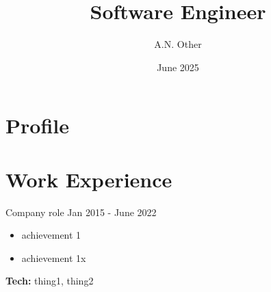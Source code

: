 \documentclass[9pt]{smart-cv}
\author{A.N. Other}
\title{Software Engineer}
\date{June 2025}
\begin{document}
  \begin{two-col}
    {
      \section*{Profile}

      \lipsum[1]
    }

    \section{Work Experience}

    \begin{job}
      {Company}
      {role}
      {Jan 2015 - June 2022}
      \begin{itemize}
        \item achievement 1
        \item achievement 1x
      \end{itemize}
      \textbf{Tech:} thing1, thing2
    \end{job}

  \end{two-col}
\end{document}
